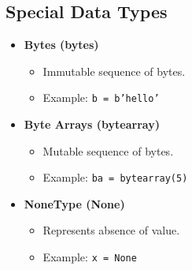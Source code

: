 \documentclass{article}
\begin{document}
\subsection{Special Data Types}
\begin{itemize}
    \item \textbf{Bytes (bytes)}
    \begin{itemize}
        \item Immutable sequence of bytes.
        \item Example: \texttt{b = b'hello'}
    \end{itemize}
    \item \textbf{Byte Arrays (bytearray)}
    \begin{itemize}
        \item Mutable sequence of bytes.
        \item Example: \texttt{ba = bytearray(5)}
    \end{itemize}
    \item \textbf{NoneType (None)}
    \begin{itemize}
        \item Represents absence of value.
        \item Example: \texttt{x = None}
    \end{itemize}
\end{itemize}
\end{document}
